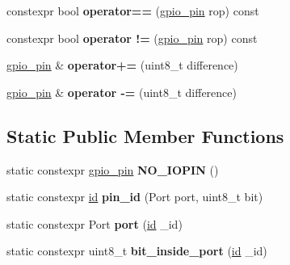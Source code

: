 \begin{DoxyCompactItemize}
constexpr bool {\bfseries operator==} (\mbox{\hyperlink{classfsl_1_1hw_1_1gpio__pin}{gpio\+\_\+pin}} rop) const
\item 
\mbox{\label{classfsl_1_1hw_1_1gpio__pin_a2832f9a8eea0c3fee8f19939ca95c9e8}} 
constexpr bool {\bfseries operator !=} (\mbox{\hyperlink{classfsl_1_1hw_1_1gpio__pin}{gpio\+\_\+pin}} rop) const
\item 
\mbox{\label{classfsl_1_1hw_1_1gpio__pin_ac3842ec0c4d0becc1a15deff938eda8d}} 
\mbox{\hyperlink{classfsl_1_1hw_1_1gpio__pin}{gpio\+\_\+pin}} \& {\bfseries operator+=} (uint8\+\_\+t difference)
\item 
\mbox{\label{classfsl_1_1hw_1_1gpio__pin_a22b66d4794872713d793a54ec324091e}} 
\mbox{\hyperlink{classfsl_1_1hw_1_1gpio__pin}{gpio\+\_\+pin}} \& {\bfseries operator -\/=} (uint8\+\_\+t difference)
\end{DoxyCompactItemize}
\subsection*{Static Public Member Functions}
\begin{DoxyCompactItemize}
\item 
\mbox{\label{classfsl_1_1hw_1_1gpio__pin_a151a0e62b2527a209e1bed64685e50df}} 
static constexpr \mbox{\hyperlink{classfsl_1_1hw_1_1gpio__pin}{gpio\+\_\+pin}} {\bfseries N\+O\+\_\+\+I\+O\+P\+IN} ()
\item 
\mbox{\label{classfsl_1_1hw_1_1gpio__pin_aa2b8bd8c3006b65a235b6ac12fb8cb6e}} 
static constexpr \mbox{\hyperlink{classfsl_1_1lg_1_1range__int}{id}} {\bfseries pin\+\_\+id} (Port port, uint8\+\_\+t bit)
\item 
\mbox{\label{classfsl_1_1hw_1_1gpio__pin_aae1b89651a4a9b1c57101349cfa24da5}} 
static constexpr Port {\bfseries port} (\mbox{\hyperlink{classfsl_1_1lg_1_1range__int}{id}} \+\_\+id)
\item 
\mbox{\label{classfsl_1_1hw_1_1gpio__pin_a970dd306b8f27277f1724c1513a5f525}} 
static constexpr uint8\+\_\+t {\bfseries bit\+\_\+inside\+\_\+port} (\mbox{\hyperlink{classfsl_1_1lg_1_1range__int}{id}} \+\_\+id)
\end{DoxyCompactItemize}
